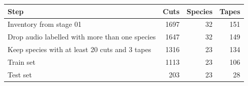 \begin{tabular}{lrrr}
\toprule
Step & Cuts & Species & Tapes \\
\midrule
Inventory from stage 01 & 1697 & 32 & 151 \\
Drop audio labelled with more than one species & 1647 & 32 & 149 \\
Keep species with at least 20 cuts and 3 tapes & 1316 & 23 & 134 \\
Train set & 1113 & 23 & 106 \\
Test set & 203 & 23 & 28 \\
\bottomrule
\end{tabular}
